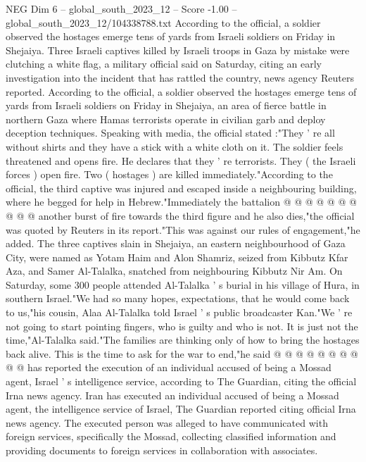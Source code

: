 \begin{textsample}{NEG Dim 6 – global\_south\_2023\_12 – Score -1.00 – global\_south\_2023\_12/104338788.txt}  \label{ex:f6_neg_350}
According to the official, a soldier observed the hostages emerge tens of yards from Israeli soldiers on Friday in Shejaiya.
Three Israeli captives killed by Israeli troops in Gaza by mistake were clutching a white flag, a military official said on Saturday, citing an early investigation into the incident that has rattled the country, news agency Reuters reported.
According to the official, a soldier observed the hostages emerge tens of yards from Israeli soldiers on Friday in Shejaiya, an area of fierce battle in northern Gaza where Hamas terrorists operate in civilian garb and deploy deception techniques.
Speaking with media, the official stated :"They ' re all without shirts and they have a stick with a white cloth on it.
The soldier feels threatened and opens fire.
He declares that they ' re terrorists.
They ( the Israeli forces ) open fire.
Two ( hostages ) are killed immediately."According to the official, the third captive was injured and escaped inside a neighbouring building, where he begged for help in Hebrew."Immediately the battalion @ @ @ @ @ @ @ @ @ @ another burst of fire towards the third figure and he also dies,"the official was quoted by Reuters in its report."This was against our rules of engagement,"he added.
The three captives slain in Shejaiya, an eastern neighbourhood of Gaza City, were named as Yotam Haim and Alon Shamriz, seized from Kibbutz Kfar Aza, and Samer Al-Talalka, snatched from neighbouring Kibbutz Nir Am.
On Saturday, some 300 people attended Al-Talalka ' s burial in his village of Hura, in southern Israel."We had so many hopes, expectations, that he would come back to us,"his cousin, Alaa Al-Talalka told Israel ' s public broadcaster Kan."We ' re not going to start pointing fingers, who is guilty and who is not.
It is just not the time,"Al-Talalka said."The families are thinking only of how to bring the hostages back alive.
This is the time to ask for the war to end,"he said @ @ @ @ @ @ @ @ @ @ has reported the execution of an individual accused of being a Mossad agent, Israel ' s intelligence service, according to The Guardian, citing the official Irna news agency.
Iran has executed an individual accused of being a Mossad agent, the intelligence service of Israel, The Guardian reported citing official Irna news agency.
The executed person was alleged to have communicated with foreign services, specifically the Mossad, collecting classified information and providing documents to foreign services in collaboration with associates.

\end{textsample}
